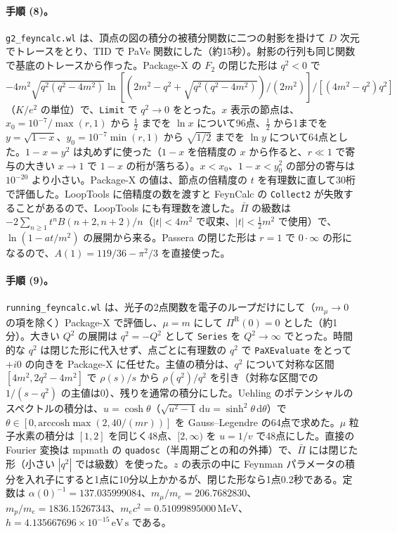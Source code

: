 \documentclass[a4paper,10pt]{ltjsarticle}
\newcommand{\dd}{\mathrm{d}}
\begin{document}
\paragraph{手順 (8)。}\texttt{g2\_feyncalc.wl} は、頂点の図の積分の被積分関数に二つの射影を掛けて $D$ 次元でトレースをとり、TID で PaVe 関数にした（約15秒）。射影の行列も同じ関数で基底のトレースから作った。Package-X の $F_2$ の閉じた形は $q^2<0$ で $-4m^2\sqrt{q^2(q^2-4m^2)}\ln[(2m^2-q^2+\sqrt{q^2(q^2-4m^2)})/(2m^2)]/[(4m^2-q^2)q^2]$（$K/e^2$ の単位）で、\texttt{Limit} で $q^2\to0$ をとった。$x$ 表示の節点は、$x_0=10^{-7}/\max(r,1)$ から $\frac12$ までを $\ln x$ について96点、$\frac12$ から1までを $y=\sqrt{1-x}$、$y_0=10^{-7}\min(r,1)$ から $\sqrt{1/2}$ までを $\ln y$ について64点とした。$1-x=y^2$ は丸めずに使った（$1-x$ を倍精度の $x$ から作ると、$r\ll1$ で寄与の大きい $x\to1$ で $1-x$ の桁が落ちる）。$x<x_0$、$1-x<y_0^2$ の部分の寄与は $10^{-20}$ より小さい。Package-X の値は、節点の倍精度の $t$ を有理数に直して30桁で評価した。LoopTools に倍精度の数を渡すと FeynCalc の \texttt{Collect2} が失敗することがあるので、LoopTools にも有理数を渡した。$\bar\Pi$ の級数は $-2\sum_{n\ge1}t^nB(n+2,n+2)/n$（$|t|<4m^2$ で収束、$|t|<\frac12m^2$ で使用）で、$\ln(1-at/m^2)$ の展開から来る。Passera の閉じた形は $r=1$ で $0\cdot\infty$ の形になるので、$A(1)=119/36-\pi^2/3$ を直接使った。

\paragraph{手順 (9)。}\texttt{running\_feyncalc.wl} は、光子の2点関数を電子のループだけにして（$m_\mu\to0$ の項を除く）Package-X で評価し、$\mu=m$ にして $\Pi^{\mathrm R}(0)=0$ とした（約1分）。大きい $Q^2$ の展開は $q^2=-Q^2$ として \texttt{Series} を $Q^2\to\infty$ でとった。時間的な $q^2$ は閉じた形に代入せず、点ごとに有理数の $q^2$ で \texttt{PaXEvaluate} をとって $+i0$ の向きを Package-X に任せた。主値の積分は、$q^2$ について対称な区間 $[4m^2,2q^2-4m^2]$ で $\rho(s)/s$ から $\rho(q^2)/q^2$ を引き（対称な区間での $1/(s-q^2)$ の主値は0）、残りを通常の積分にした。Uehling のポテンシャルのスペクトルの積分は、$u=\cosh\theta$（$\sqrt{u^2-1}\,\dd u=\sinh^2\theta\,\dd\theta$）で $\theta\in[0,\mathrm{arccosh}\max(2,40/(mr))]$ を Gauss--Legendre の64点で求めた。$\mu$ 粒子水素の積分は $[1,2]$ を同じく48点、$[2,\infty)$ を $u=1/v$ で48点にした。直接の Fourier 変換は mpmath の \texttt{quadosc}（半周期ごとの和の外挿）で、$\bar\Pi$ には閉じた形（小さい $|q^2|$ では級数）を使った。$z$ の表示の中に Feynman パラメータの積分を入れ子にすると1点に10分以上かかるが、閉じた形なら1点0.2秒である。定数は $\alpha(0)^{-1}=137.035999084$、$m_\mu/m_e=206.7682830$、$m_p/m_e=1836.15267343$、$m_ec^2=0.51099895000\,\mathrm{MeV}$、$h=4.135667696\times10^{-15}\,\mathrm{eV\,s}$ である。
\end{document}
